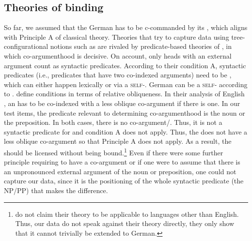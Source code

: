 \documentclass[output=paper,colorlinks,citecolor=brown]{langscibook}
\begin{document}
\subsection{Theories of binding}
\label{sec:binding:Masloch}

So far, we assumed that the German   has to be c-commanded by its , which  aligns with Principle A of classical  theory.
Theories that try to capture  data using tree-configurational notions such as  are rivaled by predicate-based theories of  \parencite[i.a.][]{pollard_anaphors_1992,reinhart_reflexivity_1993}, in which co-argumenthood is decisive.
On  account, only heads with an external argument count as syntactic predicates.
According to their condition A,  syntactic predicates (i.e., predicates that have two co-indexed arguments) need to be  , which can either happen lexically or via a \textsc{self}-.
German  can be a \textsc{self}- according to \citet{reuland_pronouns_1995}.
\citet{pollard_anaphors_1992} define  conditions in terms of relative obliqueness.
In their analysis of English , an  has to be co-indexed with a less oblique co-argument if there is one.
In our test items, the predicate relevant to determining co-argumenthood is the noun or the preposition.
In both cases, there is no co-argument/. 
Thus, it is not a syntactic predicate for \citet{reinhart_reflexivity_1993} and condition A does not apply. Thus, the  does not have a less oblique co-argument so that  Principle A does not apply. 
As a result, the  should be licensed without being bound.\footnote{\textcite{pollard_anaphors_1992} do not claim their theory to be applicable to languages other than English. Thus, our data do not speak against their theory directly, they only show that it cannot trivially be extended to German.}
Even if there were some further principle requiring  to have a co-argument or if one were to assume that there is an unpronounced external argument of the noun or preposition, one could not capture our data, since it is the positioning of the whole syntactic predicate (the NP/PP) that makes the difference. 
\end{document}
